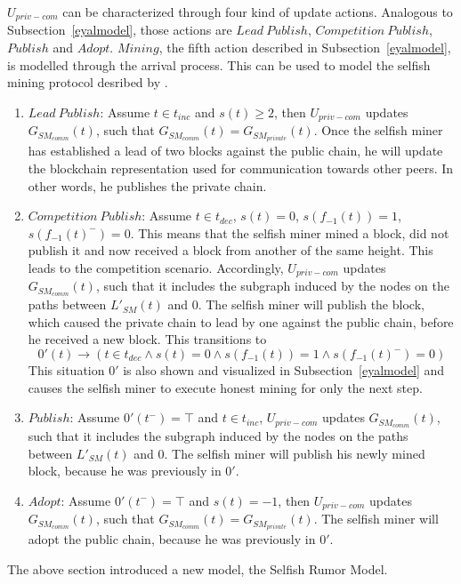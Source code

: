 $U_{priv-com}$ can be characterized through four kind of update actions. Analogous to Subsection~\ref{eyalmodel}, those actions are $Lead~Publish$, $Competition~Publish$, $Publish$ and $Adopt$. $Mining$, the fifth action described in Subsection~\ref{eyalmodel}, is modelled through the arrival process.
This can be used to model the selfish mining protocol desribed by \citeauthor{eyal}.
\begin{enumerate}
\item $Lead~Publish$: Assume $t \in t_{inc}$ and $s(t) \geq 2$, then $U_{priv-com}$ updates $G_{SM_{comm}}(t)$, such that $G_{SM_{comm}}(t) = G_{SM_{private}}(t)$. Once the selfish miner has established a lead of two blocks against the public chain, he will update the blockchain representation used for communication towards other peers. In other words, he publishes the private chain.
\item $Competition~Publish$: Assume $t \in t_{dec}$, $s(t) = 0$, $s(f_{-1}(t)) = 1$, $s(f_{-1}(t)^-) = 0$. This means that the selfish miner mined a block, did not publish it and now received a block from another of the same height. This leads to the competition scenario. Accordingly, $U_{priv-com}$ updates $G_{SM_{comm}}(t)$, such that it includes the subgraph induced by the nodes on the paths between $L'_{SM}(t)$ and ${0}$. The selfish miner will publish the block, which caused the private chain to lead by one against the public chain, before he received a new block. This transitions to 
\begin{equation}
0'(t) \rightarrow \left( t \in t_{dec} \wedge s(t) = 0 \wedge s(f_{-1}(t)) = 1 \wedge s(f_{-1}(t)^-) = 0\right)
\end{equation}
This situation $0'$ is also shown and visualized in Subsection~\ref{eyalmodel} and causes the selfish miner to execute honest mining for only the next step. \label{comppub}
\item $Publish$: Assume $0'(t^-)=\top$ and $t \in t_{inc}$, $U_{priv-com}$ updates $G_{SM_{comm}}(t)$, such that it includes the subgraph induced by the nodes on the paths between $L'_{SM}(t)$ and ${0}$. The selfish miner will publish his newly mined block, because he was previously in $0'$.
\item $Adopt$: Assume $0'(t^-)=\top$ and $s(t)=-1$, then $U_{priv-com}$ updates $G_{SM_{comm}}(t)$, such that $G_{SM_{comm}}(t) = G_{SM_{private}}(t)$. The selfish miner will adopt the public chain, because he was previously in $0'$.
\end{enumerate}
The above section introduced a new model, the Selfish Rumor Model.

